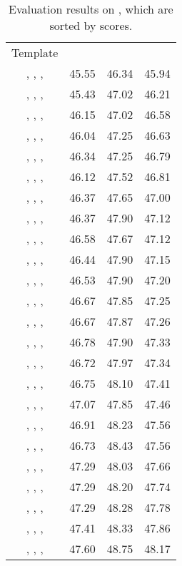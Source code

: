 \documentclass[11pt]{article}
\begin{document}
\begin{table}[]
\small
    \centering
    \begin{tabular}{c|ccc}
    \toprule
    \multirow{2}{*}{Template} & \multicolumn{3}{c}{} \\ 
    &  &  &  \\
    \midrule
, , ,  & 45.55 & 46.34 & 45.94 \\
, , ,  & 45.43 & 47.02 & 46.21 \\ 
, , ,  & 46.15 & 47.02 & 46.58 \\
, , ,  & 46.04 & 47.25 & 46.63 \\
, , ,  & 46.34 & 47.25 & 46.79 \\
, , ,  & 46.12 & 47.52 & 46.81 \\
, , ,  & 46.37 & 47.65 & 47.00 \\
, , ,  & 46.37 & 47.90 & 47.12 \\
, , ,  & 46.58 & 47.67 & 47.12 \\
, , ,  & 46.44 & 47.90 & 47.15 \\
, , ,  & 46.53 & 47.90 & 47.20 \\
, , ,  & 46.67 & 47.85 & 47.25 \\
, , ,  & 46.67 & 47.87 & 47.26 \\
, , ,  & 46.78 & 47.90 & 47.33 \\
, , ,  & 46.72 & 47.97 & 47.34 \\
, , ,  & 46.75 & 48.10 & 47.41 \\
, , ,  & 47.07 & 47.85 & 47.46 \\
, , ,  & 46.91 & 48.23 & 47.56 \\
, , ,  & 46.73 & 48.43 & 47.56 \\
, , ,  & 47.29 & 48.03 & 47.66 \\
, , ,  & 47.29 & 48.20 & 47.74 \\
, , ,  & 47.29 & 48.28 & 47.78 \\
, , ,  & 47.41 & 48.33 & 47.86 \\
, , ,  & 47.60 & 48.75 & 48.17 \\
\bottomrule
    \end{tabular}
    \caption{Evaluation results on , which are sorted by  scores.}
    \label{table:rest15_appendix_without_marker}
\end{table}
\end{document}
